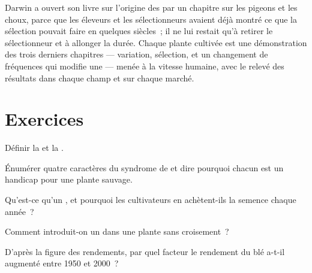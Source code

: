 \begin{remark}\label{rem:g12:domesticated-plants:oldest}
Darwin a ouvert son livre sur l'origine des  par un chapitre
sur les pigeons et les choux, parce que les éleveurs et les
sélectionneurs avaient déjà montré ce que la sélection pouvait faire
en quelques siècles~; il ne lui restait qu'à retirer le sélectionneur
et à allonger la durée. Chaque plante cultivée est une démonstration
des trois derniers chapitres --- variation, sélection, et un
changement de fréquences qui modifie une  --- menée à la vitesse
humaine, avec le relevé des résultats dans chaque champ et sur chaque
marché.
\end{remark}

\section{Exercices}

\begin{exercise}[$\star$]\label{exo:g12:domesticated-plants:1}
Définir la  et la .
\end{exercise}

\begin{exercise}[$\star$]\label{exo:g12:domesticated-plants:2}
Énumérer quatre caractères du syndrome de  et dire
pourquoi chacun est un handicap pour une plante sauvage.
\end{exercise}

\begin{exercise}[$\star$]\label{exo:g12:domesticated-plants:3}
Qu'est-ce qu'un , et pourquoi les cultivateurs en
achètent-ils la semence chaque année~?
\end{exercise}

\begin{exercise}[$\star$]\label{exo:g12:domesticated-plants:4}
Comment introduit-on un  dans une plante sans croisement~?
\end{exercise}

\begin{exercise}[$\star$]\label{exo:g12:domesticated-plants:5}
D'après la figure des rendements, par quel facteur le rendement du blé
a-t-il augmenté entre 1950 et 2000~?
\end{exercise}

